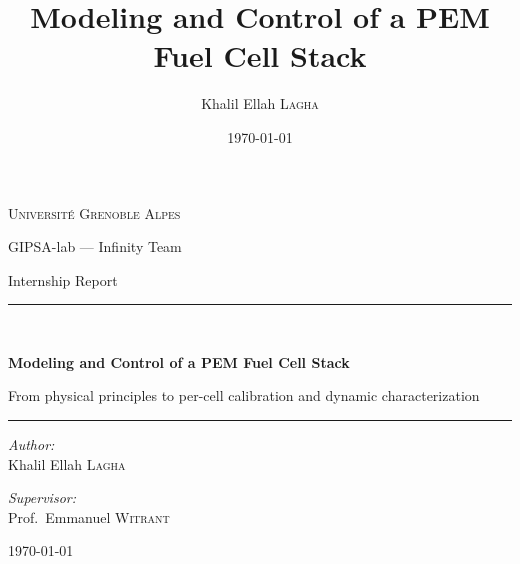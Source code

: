 \documentclass[11pt,a4paper]{article}
\title{Modeling and Control of a PEM Fuel Cell Stack}
\author{Khalil Ellah \textsc{Lagha}}
\date{\today}
\begin{document}
\begin{titlepage}
\begin{center}
    \vspace*{1.5cm}
    {\scshape\LARGE Universit\'e Grenoble Alpes\par}
    {\large GIPSA-lab --- Infinity Team\par}
    \vspace{2.5cm}
    {\Large Internship Report\par}
    \vspace{0.6cm}
    \rule{\textwidth}{0.4pt}\\[0.5cm]
    {\huge\bfseries Modeling and Control of a PEM Fuel Cell Stack\par}
    \vspace{0.3cm}
    {\large From physical principles to per-cell calibration and dynamic characterization\par}
    \vspace{0.4cm}
    \rule{\textwidth}{0.4pt}
    \vspace{2.5cm}

    \begin{minipage}[t]{0.45\textwidth}
        \begin{flushleft}\large
        \emph{Author:}\\
        Khalil Ellah \textsc{Lagha}
        \end{flushleft}
    \end{minipage}
    \begin{minipage}[t]{0.45\textwidth}
        \begin{flushright}\large
        \emph{Supervisor:}\\
        Prof.\ Emmanuel \textsc{Witrant}
        \end{flushright}
    \end{minipage}

    \vfill
    {\large \today\par}
\end{center}
\end{titlepage}
\end{document}
